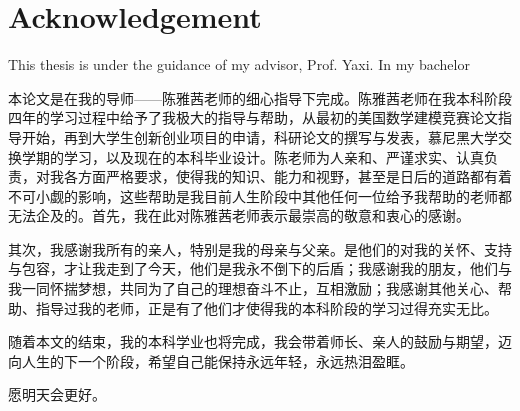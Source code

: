 \chapter*{Acknowledgement}

This thesis is under the guidance of my advisor, Prof. Yaxi. In my bachelor 

本论文是在我的导师——陈雅茜老师的细心指导下完成。陈雅茜老师在我本科阶段四年的学习过程中给予了我极大的指导与帮助，从最初的美国数学建模竞赛论文指导开始，再到大学生创新创业项目的申请，科研论文的撰写与发表，慕尼黑大学交换学期的学习，以及现在的本科毕业设计。陈老师为人亲和、严谨求实、认真负责，对我各方面严格要求，使得我的知识、能力和视野，甚至是日后的道路都有着不可小觑的影响，这些帮助是我目前人生阶段中其他任何一位给予我帮助的老师都无法企及的。首先，我在此对陈雅茜老师表示最崇高的敬意和衷心的感谢。

其次，我感谢我所有的亲人，特别是我的母亲与父亲。是他们的对我的关怀、支持与包容，才让我走到了今天，他们是我永不倒下的后盾；我感谢我的朋友，他们与我一同怀揣梦想，共同为了自己的理想奋斗不止，互相激励；我感谢其他关心、帮助、指导过我的老师，正是有了他们才使得我的本科阶段的学习过得充实无比。

随着本文的结束，我的本科学业也将完成，我会带着师长、亲人的鼓励与期望，迈向人生的下一个阶段，希望自己能保持永远年轻，永远热泪盈眶。

愿明天会更好。
